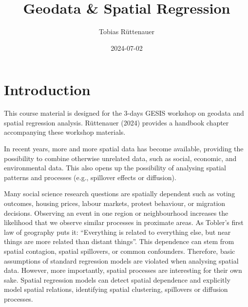 \documentclass[
  letterpaper,
]{scrbook}
\title{Geodata \& Spatial Regression}
\author{Tobias Rüttenauer}
\date{2024-07-02}
\renewcommand*\contentsname{Table of contents}
\newcommand\contentsname{Table of contents}
\begin{document}
\frontmatter
\maketitle
\ifdefined\Shaded\renewenvironment{Shaded}{\begin{tcolorbox}[frame hidden, boxrule=0pt, enhanced, sharp corners, breakable, borderline west={3pt}{0pt}{shadecolor}, interior hidden]}{\end{tcolorbox}}\fi

\renewcommand*\contentsname{Table of contents}
{
\setcounter{tocdepth}{2}
\tableofcontents
}
\mainmatter
{}

\hypertarget{introduction}{%
\chapter*{Introduction}\label{introduction}}


This course material is designed for the 3-days GESIS workshop on
geodata and spatial regression analysis. Rüttenauer (2024) provides a
handbook chapter accompanying these workshop materials.

In recent years, more and more spatial data has become available,
providing the possibility to combine otherwise unrelated data, such as
social, economic, and environmental data. This also opens up the
possibility of analysing spatial patterns and processes (e.g., spillover
effects or diffusion).

Many social science research questions are spatially dependent such as
voting outcomes, housing prices, labour markets, protest behaviour, or
migration decisions. Observing an event in one region or neighbourhood
increases the likelihood that we observe similar processes in proximate
areas. As Tobler's first law of geography puts it: ``Everything is
related to everything else, but near things are more related than
distant things''. This dependence can stem from spatial contagion,
spatial spillovers, or common confounders. Therefore, basic assumptions
of standard regression models are violated when analysing spatial data.
However, more importantly, spatial processes are interesting for their
own sake. Spatial regression models can detect spatial dependence and
explicitly model spatial relations, identifying spatial clustering,
spillovers or diffusion processes.
\end{document}
